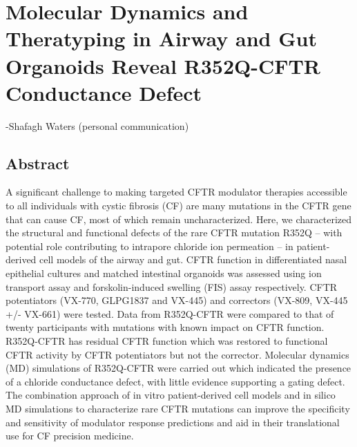 \chapter{Molecular Dynamics and Theratyping in Airway and Gut Organoids Reveal R352Q-CFTR Conductance Defect}
\label{chap:R352Q}
 {-Shafagh Waters (personal communication)}

\section*{\centering Abstract} 
A significant challenge to making targeted CFTR modulator therapies accessible to all individuals with cystic fibrosis (CF) are many mutations in the CFTR gene that can cause CF, most of which remain uncharacterized. Here, we characterized the structural and functional defects of the rare CFTR mutation R352Q – with potential role contributing to intrapore chloride ion permeation – in patient-derived cell models of the airway and gut. CFTR function in differentiated nasal epithelial cultures and matched intestinal organoids was assessed using ion transport assay and forskolin-induced swelling (FIS) assay respectively. CFTR potentiators (VX-770, GLPG1837 and VX-445) and correctors (VX-809, VX-445 +/- VX-661) were tested.  Data from R352Q-CFTR were compared to that of twenty participants with mutations with known impact on CFTR function. R352Q-CFTR has residual CFTR function which was restored to functional CFTR activity by CFTR potentiators but not the corrector. Molecular dynamics (MD) simulations of R352Q-CFTR were carried out which indicated the presence of a chloride conductance defect, with little evidence supporting a gating defect. The combination approach of in vitro patient-derived cell models and in silico MD simulations to characterize rare CFTR mutations can improve the specificity and sensitivity of modulator response predictions and aid in their translational use for CF precision medicine.


\smallskip

